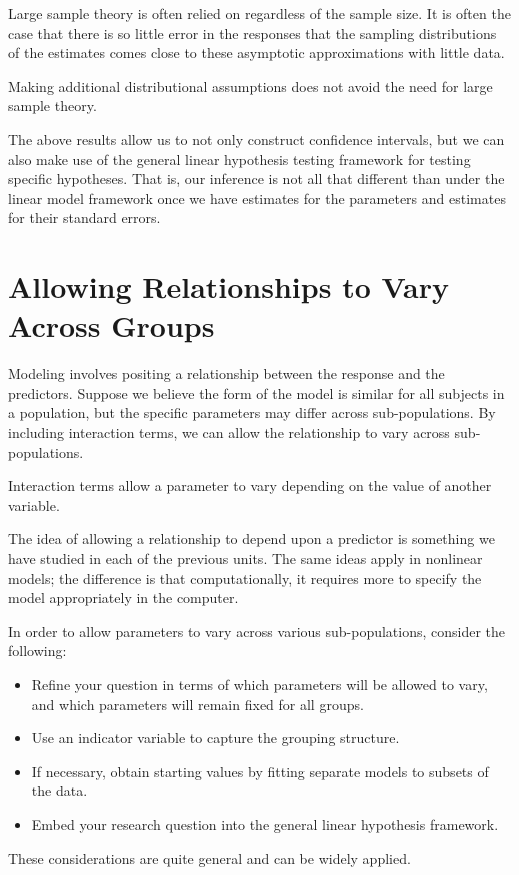 \documentclass[
]{book}
\providecommand{\tightlist}{%
  \setlength{\itemsep}{0pt}\setlength{\parskip}{0pt}}
\theoremstyle{plain}
\theoremstyle{mydefn}
\theoremstyle{myexmpl}
\theoremstyle{remark}
\begin{document}
\begin{rmdtip}
Large sample theory is often relied on regardless of the sample size. It is often the case that there is so little error in the responses that the sampling distributions of the estimates comes close to these asymptotic approximations with little data.

Making additional distributional assumptions does not avoid the need for large sample theory.
\end{rmdtip}

The above results allow us to not only construct confidence intervals, but we can also make use of the general linear hypothesis testing framework for testing specific hypotheses. That is, our inference is not all that different than under the linear model framework once we have estimates for the parameters and estimates for their standard errors.

\hypertarget{allowing-relationships-to-vary-across-groups}{%
\section{Allowing Relationships to Vary Across Groups}\label{allowing-relationships-to-vary-across-groups}}

Modeling involves positing a relationship between the response and the predictors. Suppose we believe the form of the model is similar for all subjects in a population, but the specific parameters may differ across sub-populations. By including interaction terms, we can allow the relationship to vary across sub-populations.

\begin{rmdkeyidea}
Interaction terms allow a parameter to vary depending on the value of another variable.
\end{rmdkeyidea}

The idea of allowing a relationship to depend upon a predictor is something we have studied in each of the previous units. The same ideas apply in nonlinear models; the difference is that computationally, it requires more to specify the model appropriately in the computer.

\begin{rmdtip}
In order to allow parameters to vary across various sub-populations, consider the following:

\begin{itemize}
\tightlist
\item
  Refine your question in terms of which parameters will be allowed to vary, and which parameters will remain fixed for all groups.
\item
  Use an indicator variable to capture the grouping structure.
\item
  If necessary, obtain starting values by fitting separate models to subsets of the data.
\item
  Embed your research question into the general linear hypothesis framework.
\end{itemize}

These considerations are quite general and can be widely applied.
\end{rmdtip}
\end{document}
